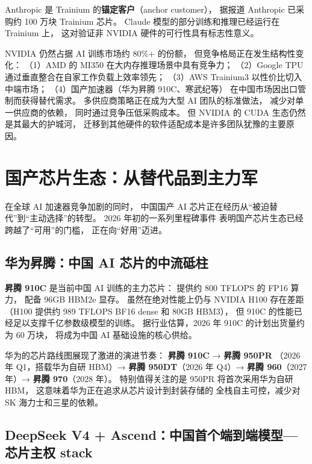 Anthropic 是 Trainium 的\textbf{锚定客户}（anchor customer），
据报道 Anthropic 已采购约 100 万块 Trainium 芯片。
Claude 模型的部分训练和推理已经运行在 Trainium 上，
这对验证非 NVIDIA 硬件的可行性具有标志性意义。

\begin{keybox}[AI 加速器的竞争格局（2026 年）]
NVIDIA 仍然占据 AI 训练市场约 80\%+ 的份额，
但竞争格局正在发生结构性变化：
（1）AMD 的 MI350 在大内存推理场景中具有竞争力；
（2）Google TPU 通过垂直整合在自家工作负载上效率领先；
（3）AWS Trainium3 以性价比切入中端市场；
（4）国产加速器（华为昇腾 910C、寒武纪等）
在中国市场因出口管制而获得替代需求。
多供应商策略正在成为大型 AI 团队的标准做法，
减少对单一供应商的依赖，
同时通过竞争压低采购成本。
但 NVIDIA 的 CUDA 生态仍然是其最大的护城河，
迁移到其他硬件的软件适配成本是许多团队犹豫的主要原因。
\end{keybox}

\section{国产芯片生态：从替代品到主力军}
\label{sec:domestic-chips}

在全球 AI 加速器竞争加剧的同时，
中国国产 AI 芯片正在经历从“被迫替代”到“主动选择”的转型。
2026 年初的一系列里程碑事件
表明国产芯片生态已经跨越了“可用”的门槛，
正在向“好用”迈进。

\subsection{华为昇腾：中国 AI 芯片的中流砥柱}

\textbf{昇腾 910C}
是当前中国 AI 训练的主力芯片：
提供约 800 TFLOPS 的 FP16 算力，
配备 96GB HBM2e 显存。
虽然在绝对性能上仍与 NVIDIA H100 存在差距
（H100 提供约 989 TFLOPS BF16 dense 和 80GB HBM3），
但 910C 的性能已经足以支撑千亿参数级模型的训练。
据行业估算，2026 年 910C 的计划出货量约为 60 万块，
将成为中国 AI 基础设施的核心供给。

华为的芯片路线图展现了激进的演进节奏：
\textbf{昇腾 910C} → \textbf{昇腾 950PR}
（2026 年 Q1，搭载华为自研 HBM）→
\textbf{昇腾 950DT}（2026 年 Q4）→
\textbf{昇腾 960}（2027 年）→
\textbf{昇腾 970}（2028 年）。
特别值得关注的是 950PR 将首次采用华为自研 HBM，
这意味着华为正在追求从芯片设计到封装存储的
全栈自主可控，减少对 SK 海力士和三星的依赖。

\subsection{DeepSeek V4 + Ascend：中国首个端到端模型—芯片主权 stack}

